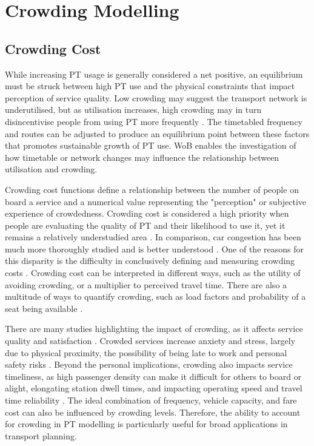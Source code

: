 \chapter{Crowding Modelling}
\label{chap:ModelSpec}

\section{Crowding Cost}
\label{sec:crowding_cost}
While increasing PT usage is generally considered a net positive, an equilibrium must be struck between high PT use and the physical constraints that impact perception of service quality. Low crowding may suggest the transport network is underutilised, but as utilisation increases, high crowding may in turn disincentivise people from using PT more frequently \cite{luanPassengerorientedTrafficControl2022}. The timetabled frequency and routes can be adjusted to produce an equilibrium point between these factors that promotes sustainable growth of PT use. WoB enables the investigation of how timetable or network changes may influence the relationship between utilisation and crowding. 

Crowding cost functions define a relationship between the number of people on board a service and a numerical value representing the "perception" or subjective experience of crowdedness. Crowding cost is considered a high priority when people are evaluating the quality of PT and their likelihood to use it, yet it remains a relatively understudied area \cite{mohringOptimizationScaleEconomies1972, turveyOptimalBusFares1975}. In comparison, car congestion has been much more thoroughly studied and is better understood \cite{arnottEconomicsTrafficCongestion1994, johanssonOptimalRoadpricingSimultaneous1997}. One of the reasons for this disparity is the difficulty in conclusively defining and measuring crowding costs \cite{qinInvestigatingInVehicleCrowding2014}. Crowding cost can be interpreted in different ways, such as the utility of avoiding crowding, or a multiplier to perceived travel time. There are also a multitude of ways to quantify crowding, such as load factors and probability of a seat being available \cite{douglasEstimatingPassengerCost2006, yapCrowdingValuationUrban2020}.

There are many studies highlighting the impact of crowding, as it affects service quality and satisfaction \cite{luanPassengerorientedTrafficControl2022}. Crowded services increase anxiety and stress, largely due to physical proximity, the possibility of being late to work and personal safety risks \cite{haywoodCrowdingPublicTransport2017, chengExploringPassengerAnxiety2010, evansCrowdingPersonalSpace2007, coxRailPassengerCrowding2006}.
Beyond the personal implications, crowding also impacts service timeliness, as high passenger density can make it difficult for others to board or alight, elongating station dwell times, and impacting operating speed and travel time reliability \cite{tirachiniCrowdingPublicTransport2013}. The ideal combination of frequency, vehicle capacity, and fare cost can also be influenced by crowding levels. Therefore, the ability to account for crowding in PT modelling is particularly useful for broad applications in transport planning. 

